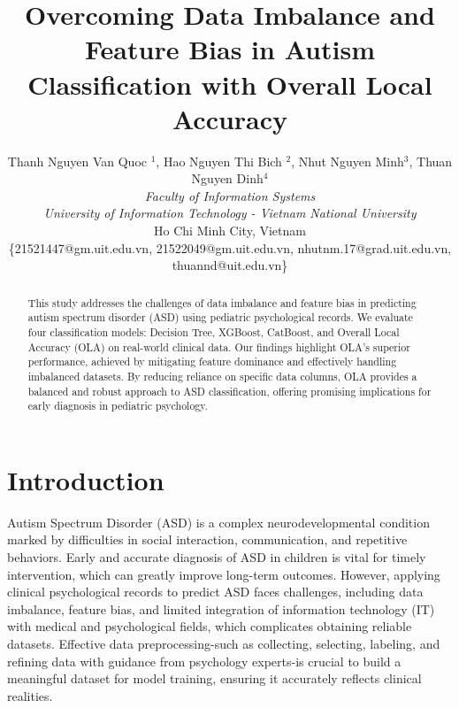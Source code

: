 \documentclass[conference]{IEEEtran}
\begin{document}
\title{Overcoming Data Imbalance and Feature Bias in Autism Classification with Overall Local Accuracy }

\author{
Thanh Nguyen Van Quoc $^{1}$, Hao Nguyen Thi Bich $^{2}$, Nhut Nguyen Minh$^{3}$, Thuan Nguyen Dinh$^{4}$\\
\textit{Faculty of Information Systems} \\
\textit{University of Information Technology - Vietnam National University} \\
Ho Chi Minh City, Vietnam \\
\{21521447@gm.uit.edu.vn, 21522049@gm.uit.edu.vn, nhutnm.17@grad.uit.edu.vn, thuannd@uit.edu.vn\}
}

\maketitle
\onecolumn
\begin{abstract}
This study addresses the challenges of data imbalance and feature bias in predicting autism spectrum disorder (ASD) using pediatric psychological records. We evaluate four classification models: Decision Tree, XGBoost, CatBoost, and Overall Local Accuracy (OLA) on real-world clinical data. Our findings highlight OLA's superior performance, achieved by mitigating feature dominance and effectively handling imbalanced datasets. By reducing reliance on specific data columns, OLA provides a balanced and robust approach to ASD classification, offering promising implications for early diagnosis in pediatric psychology.
\end{abstract}


\section{Introduction}
Autism Spectrum Disorder (ASD) is a complex neurodevelopmental condition marked by difficulties in social interaction, communication, and repetitive behaviors. Early and accurate diagnosis of ASD in children is vital for timely intervention, which can greatly improve long-term outcomes. However, applying clinical psychological records to predict ASD faces challenges, including data imbalance, feature bias, and limited integration of information technology (IT) with medical and psychological fields, which complicates obtaining reliable datasets. Effective data preprocessing-such as collecting, selecting, labeling, and refining data with guidance from psychology experts-is crucial to build a meaningful dataset for model training, ensuring it accurately reflects clinical realities.
\end{document}

